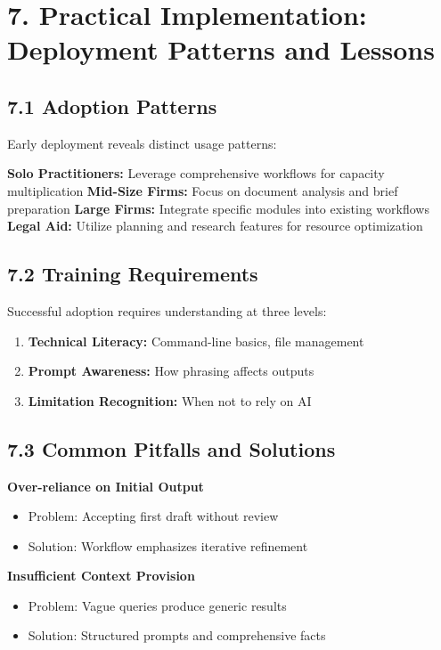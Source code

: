 \documentclass[12pt,a4paper]{article}
\begin{document}
\section*{7. Practical Implementation: Deployment Patterns and Lessons}

\subsection*{7.1 Adoption Patterns}

Early deployment reveals distinct usage patterns:

\textbf{Solo Practitioners:} Leverage comprehensive workflows for capacity multiplication
\textbf{Mid-Size Firms:} Focus on document analysis and brief preparation
\textbf{Large Firms:} Integrate specific modules into existing workflows
\textbf{Legal Aid:} Utilize planning and research features for resource optimization

\subsection*{7.2 Training Requirements}

Successful adoption requires understanding at three levels:

\begin{enumerate}
\item \textbf{Technical Literacy:} Command-line basics, file management
\item \textbf{Prompt Awareness:} How phrasing affects outputs
\item \textbf{Limitation Recognition:} When not to rely on AI
\end{enumerate}

\subsection*{7.3 Common Pitfalls and Solutions}

\textbf{Over-reliance on Initial Output}
\begin{itemize}
\item Problem: Accepting first draft without review
\item Solution: Workflow emphasizes iterative refinement
\end{itemize}

\textbf{Insufficient Context Provision}
\begin{itemize}
\item Problem: Vague queries produce generic results
\item Solution: Structured prompts and comprehensive facts
\end{itemize}
\end{document}
